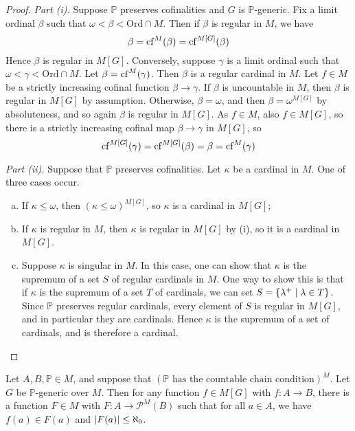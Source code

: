 \begin{proof}
    \emph{Part (i).}
    Suppose \( \mathbb P \) preserves cofinalities and \( G \) is \( \mathbb P \)-generic.
    Fix a limit ordinal \( \beta \) such that \( \omega < \beta < \mathrm{Ord} \cap M \).
    Then if \( \beta \) is regular in \( M \), we have
    \[ \beta = \operatorname{cf}^M(\beta) = \operatorname{cf}^{M[G]}(\beta) \]
    Hence \( \beta \) is regular in \( M[G] \).
    Conversely, suppose \( \gamma \) is a limit ordinal such that \( \omega < \gamma < \mathrm{Ord} \cap M \).
    Let \( \beta = \operatorname{cf}^M(\gamma) \).
    Then \( \beta \) is a regular cardinal in \( M \).
    Let \( f \in M \) be a strictly increasing cofinal function \( \beta \to \gamma \).
    If \( \beta \) is uncountable in \( M \), then \( \beta \) is regular in \( M[G] \) by assumption.
    Otherwise, \( \beta = \omega \), and then \( \beta = \omega^{M[G]} \) by absoluteness, and so again \( \beta \) is regular in \( M[G] \).
    As \( f \in M \), also \( f \in M[G] \), so there is a strictly increasing cofinal map \( \beta \to \gamma \) in \( M[G] \), so
    \[ \operatorname{cf}^{M[G]}(\gamma) = \operatorname{cf}^{M[G]}(\beta) = \beta = \operatorname{cf}^M(\gamma) \]

    \emph{Part (ii).}
    Suppose that \( \mathbb P \) preserves cofinalities.
    Let \( \kappa \) be a cardinal in \( M \).
    One of three cases occur.
    \begin{enumerate}[(a)]
        \item If \( \kappa \leq \omega \), then \( (\kappa \leq \omega)^{M[G]} \), so \( \kappa \) is a cardinal in \( M[G] \);
        \item If \( \kappa \) is regular in \( M \), then \( \kappa \) is regular in \( M[G] \) by (i), so it is a cardinal in \( M[G] \).
        \item Suppose \( \kappa \) is singular in \( M \).
        In this case, one can show that \( \kappa \) is the supremum of a set \( S \) of regular cardinals in \( M \).
        One way to show this is that if \( \kappa \) is the supremum of a set \( T \) of cardinals, we can set \( S = \qty{\lambda^+ \mid \lambda \in T} \).
        Since \( \mathbb P \) preserves regular cardinals, every element of \( S \) is regular in \( M[G] \), and in particular they are cardinals.
        Hence \( \kappa \) is the supremum of a set of cardinals, and is therefore a cardinal.
    \end{enumerate}
\end{proof}
\begin{lemma}
    Let \( A, B, \mathbb P \in M \), and suppose that \( (\mathbb P \text{ has the countable chain condition})^M \).
    Let \( G \) be \( \mathbb P \)-generic over \( M \).
    Then for any function \( f \in M[G] \) with \( f : A \to B \), there is a function \( F \in M \) with \( F : A \to \mathcal P^M(B) \) such that for all \( a \in A \), we have \( f(a) \in F(a) \) and \( \abs{F(a)} \leq \aleph_0 \).
\end{lemma}
